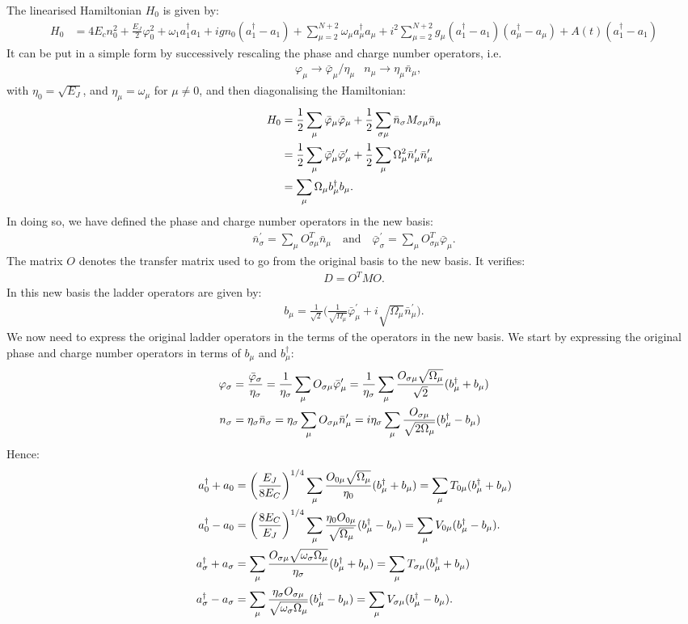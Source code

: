 \documentclass[prb]{revtex4}
\newcommand{\eq}[1]{\begin{align}#1\end{align}}
\begin{document}
The linearised Hamiltonian $H_0$ is given by:
\eq{
H_0 &= 4 E_c n_0^2 +\frac{E_J}{2} \varphi_0^2 + \omega_1 a_1^\dag a_1  + ig n_0 ( a_1^\dag- a_1 ) + \sum_{\mu=2}^{N+2} \omega_\mu a_\mu^\dag a_\mu + i^2 \sum_{\mu=2}^{N+2} g_\mu ( a_1^\dag - a_1   ) (a_\mu^\dag - a_\mu)  + A(t) (a_1^\dag- a_1) 
}
It can be put in a simple form by successively rescaling the phase and charge number operators, i.e. 
\eq{
& \varphi_\mu \rightarrow \bar \varphi_\mu/\eta_\mu  & n_\mu \rightarrow \eta_\mu \bar n_{\mu},
} 
with $\eta_0 = \sqrt{E_J}$, and $\eta_\mu = \omega_\mu$ for $\mu \ne 0$, 
and then diagonalising the Hamiltonian:
\eq{
H_0&= \frac{1}{2} \sum_\mu \bar \varphi_\mu \bar \varphi_\mu +  \frac{1}{2} \sum_{\sigma \mu} \bar n_\sigma M_{\sigma \mu} \bar n_\mu \notag \\
&=  \frac{1}{2} \sum_\mu \bar \varphi_\mu^\prime \bar \varphi_\mu^\prime +  \frac{1}{2} \sum_{\mu} \Omega_\mu^2 \bar n_\mu^\prime \bar n_\mu^\prime \notag \\
&=  \sum_\mu \Omega_\mu  b_\mu^\dag b_\mu.
}
In doing so, we have defined the phase and charge number operators in the new basis:
\eq{
\bar n_\sigma^\prime = \sum_\mu O^T_{\sigma \mu} \bar n_\mu \quad \text{and} \quad \bar \varphi_\sigma^\prime = \sum_\mu O^T_{\sigma \mu} \bar \varphi_\mu.
}
The matrix $O$ denotes the transfer matrix used to go from the original basis to the new basis. It verifies:
\eq{
D = O^T M O.
}
In this new basis the ladder operators are given by:
\eq{
b_\mu = \frac{1}{\sqrt{2}}\bigg( \frac{1}{\sqrt{\Omega_\mu}}\bar \varphi_\mu^\prime + i\sqrt{\Omega_\mu} \bar n_\mu^\prime \bigg).
}
We now need to express the original ladder operators in the terms of the operators in the new basis. We start by expressing the original phase and charge number operators in terms of $b_\mu$ and $b_\mu^\dag$:
\eq{
\varphi_\sigma &= \frac{\bar \varphi_\sigma}{\eta_\sigma} = \frac{1}{\eta_\sigma} \sum_\mu O_{\sigma\mu} \bar \varphi_\mu^\prime =  \frac{1}{\eta_\sigma} \sum_\mu \frac{O_{\sigma\mu}\sqrt{\Omega_\mu}}{\sqrt{2}}  (b_\mu^\dag + b_\mu)  \notag \\
n_\sigma &=\eta_\sigma  \bar n_\sigma = \eta_\sigma \sum_\mu O_{\sigma\mu} \bar n_\mu^\prime = i\eta_\sigma  \sum_\mu \frac{O_{\sigma\mu}}{\sqrt{2\Omega_\mu}}  (b_\mu^\dag - b_\mu) 
}
Hence:
\eq{
a_0^\dag + a_0 &=  \left(\frac{E_J}{8E_C} \right)^{1/4}\sum_\mu  \frac{O_{0\mu}\sqrt{ \Omega_\mu} }{\eta_0}  (b_\mu^\dag + b_\mu) = \sum_\mu  T_{0\mu}  (b_\mu^\dag + b_\mu)             \notag \\
a_0^\dag - a_0 &=   \left(\frac{8E_C}{E_J} \right)^{1/4} \sum_\mu \frac{\eta_0 O_{0\mu}}{\sqrt{\Omega_\mu}}  (b_\mu^\dag - b_\mu) = \sum_\mu V_{0 \mu}(b_\mu^\dag - b_\mu).  \notag \\
a_\sigma^\dag + a_\sigma &= \sum_\mu \frac{O_{\sigma\mu}\sqrt{\omega_\sigma \Omega_\mu} }{\eta_\sigma}  (b_\mu^\dag + b_\mu) = \sum_\mu  T_{\sigma\mu}  (b_\mu^\dag + b_\mu)             \notag \\
a_\sigma^\dag - a_\sigma &=   \sum_\mu \frac{\eta_\sigma O_{\sigma\mu}}{\sqrt{\omega_\sigma\Omega_\mu}}  (b_\mu^\dag - b_\mu) = \sum_\mu V_{\sigma \mu}(b_\mu^\dag - b_\mu).
}
\end{document}
